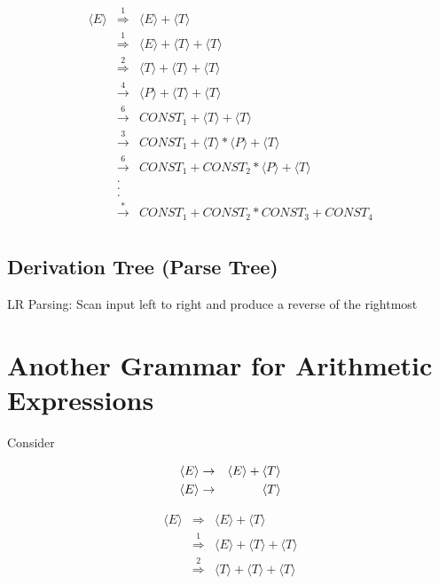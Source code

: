 \documentclass[a4paper,12pt]{article}
\begin{document}
\begin{eqnarray*}
\langle E \rangle	&	\stackrel{1}{\Rightarrow}	& \langle E \rangle + \langle T \rangle \\
						&	\stackrel{1}{\Rightarrow}	& \langle E \rangle + \langle T \rangle + \langle T \rangle \\
						&	\stackrel{2}{\Rightarrow}	& \langle T \rangle + \langle T \rangle + \langle T \rangle \\
						&	\stackrel{4}{\rightarrow}	& \langle P \rangle + \langle T \rangle + \langle T \rangle \\
						&	\stackrel{6}{\rightarrow}	& CONST_{1} + \langle T \rangle + \langle T \rangle \\
						&	\stackrel{3}{\rightarrow}	& CONST_{1} + \langle T \rangle \ast \langle P \rangle + \langle T \rangle \\
						&	\stackrel{6}{\rightarrow}	& CONST_{1} + CONST_{2} \ast \langle P \rangle + \langle T \rangle \\
						&	.	& \\
						&	.	&	\\
						&	.	&	\\
						&	\stackrel{*}{\rightarrow}	& CONST_{1} + CONST_{2} \ast CONST_{3} + CONST_{4} \\
\end{eqnarray*}

\subsection*{Derivation Tree (Parse Tree)}


LR Parsing: Scan input left to right and produce a reverse of the
rightmost %

\section*{Another Grammar for Arithmetic Expressions}

Consider

\begin{eqnarray}
\setcounter{equation}{1}
\langle E \rangle		& \to	& \langle E \rangle + \langle T \rangle \\
\langle E \rangle		& \to	& \langle T \rangle \\
\end{eqnarray}

\begin{eqnarray*}
\langle E \rangle	&	\stackrel{}{\Rightarrow}	&	\langle E \rangle + \langle T \rangle \\
						&	\stackrel{1}{\Rightarrow}	&	\langle E \rangle + \langle T \rangle + \langle T \rangle \\
						&	\stackrel{2}{\Rightarrow}	&	\langle T \rangle + \langle T \rangle + \langle T \rangle 
\end{eqnarray*}
\end{document}
